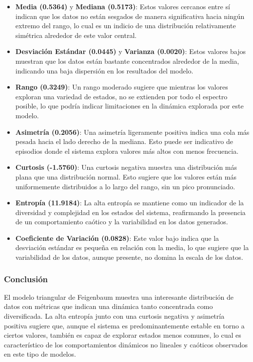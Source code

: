 \documentclass[11pt]{article}
\begin{document}
\begin{itemize}
\item
  \textbf{Media (0.5364)} y \textbf{Mediana (0.5173)}: Estos valores
  cercanos entre sí indican que los datos no están sesgados de manera
  significativa hacia ningún extremo del rango, lo cual es un indicio de
  una distribución relativamente simétrica alrededor de este valor
  central.
\item
  \textbf{Desviación Estándar (0.0445)} y \textbf{Varianza (0.0020)}:
  Estos valores bajos muestran que los datos están bastante concentrados
  alrededor de la media, indicando una baja dispersión en los resultados
  del modelo.
\item
  \textbf{Rango (0.3249)}: Un rango moderado sugiere que mientras los
  valores exploran una variedad de estados, no se extienden por todo el
  espectro posible, lo que podría indicar limitaciones en la dinámica
  explorada por este modelo.
\item
  \textbf{Asimetría (0.2056)}: Una asimetría ligeramente positiva indica
  una cola más pesada hacia el lado derecho de la mediana. Esto puede
  ser indicativo de episodios donde el sistema explora valores más altos
  con menos frecuencia.
\item
  \textbf{Curtosis (-1.5760)}: Una curtosis negativa muestra una
  distribución más plana que una distribución normal. Esto sugiere que
  los valores están más uniformemente distribuidos a lo largo del rango,
  sin un pico pronunciado.
\item
  \textbf{Entropía (11.9184)}: La alta entropía se mantiene como un
  indicador de la diversidad y complejidad en los estados del sistema,
  reafirmando la presencia de un comportamiento caótico y la
  variabilidad en los datos generados.
\item
  \textbf{Coeficiente de Variación (0.0828)}: Este valor bajo indica que
  la desviación estándar es pequeña en relación con la media, lo que
  sugiere que la variabilidad de los datos, aunque presente, no domina
  la escala de los datos.
\end{itemize}

\hypertarget{conclusiuxf3n}{%
\subsubsection{Conclusión}\label{conclusiuxf3n}}

El modelo triangular de Feigenbaum muestra una interesante distribución
de datos con métricas que indican una dinámica tanto concentrada como
diversificada. La alta entropía junto con una curtosis negativa y
asimetría positiva sugiere que, aunque el sistema es predominantemente
estable en torno a ciertos valores, también es capaz de explorar estados
menos comunes, lo cual es característico de los comportamientos
dinámicos no lineales y caóticos observados en este tipo de modelos.
\end{document}
